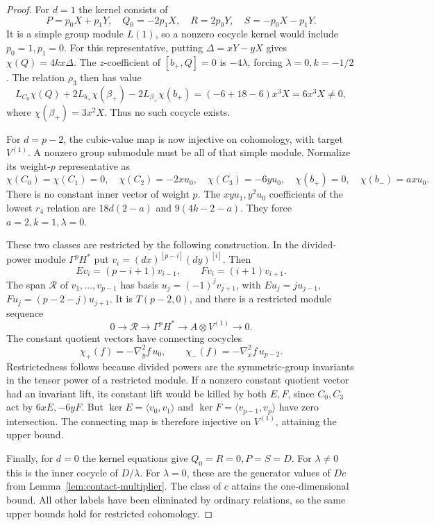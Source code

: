 \documentclass[11pt]{article}
\theoremstyle{plain}
\theoremstyle{definition}
\theoremstyle{remark}
\numberwithin{equation}{section}
\begin{document}
\begin{proof}
For \(d=1\) the kernel consists of
\[
 P=p_0X+p_1Y,\quad Q_0=-2p_1X,\quad
 R=2p_0Y,\quad S=-p_0X-p_1Y .
\]
It is a simple group module \(L(1)\), so a nonzero cocycle
kernel would include \(p_0=1,p_1=0\).
For this representative, putting \(\Delta=xY-yX\) gives
\(\chi(Q)=4kx\Delta\). The \(z\)-coefficient of \([b_+,Q]=0\)
is \(-4\lambda\), forcing \(\lambda=0,k=-1/2\).
The relation \(\rho_3\) then has value
\[
 L_{C_0}\chi(Q)+2L_{b_+}\chi(\beta_+)
                  -2L_{\beta_+}\chi(b_+)
      =(-6+18-6)x^3X=6x^3X\ne0,
\]
where \(\chi(\beta_+)=3x^2X\).
Thus no such cocycle exists.

For \(d=p-2\), the cubic-value map is now injective on cohomology,
with target \(V^{(1)}\).
A nonzero group submodule must be all of that simple module.
Normalize its weight-\(p\) representative as
\[
 \chi(C_0)=\chi(C_1)=0,\quad
 \chi(C_2)=-2xu_0,\quad\chi(C_3)=-6yu_0,\quad
 \chi(b_+)=0,\quad\chi(b_-)=a xu_0 .
\]
There is no constant inner vector of weight \(p\).
The \(xyu_1,y^2u_0\) coefficients of the lowest \(r_4\) relation
are \(18d(2-a)\) and \(9(4k-2-a)\).
They force \(a=2,k=1,\lambda=0\).

These two classes are restricted by the following construction.
In the divided-power module \(\Gamma^pH^*\) put
\(v_i=(dx)^{[p-i]}(dy)^{[i]}\).
Then
\[
 Ev_i=(p-i+1)v_{i-1},\qquad Fv_i=(i+1)v_{i+1}.
\]
The span \(\mathcal R\) of \(v_1,\ldots,v_{p-1}\) has basis
\(u_j=(-1)^jv_{j+1}\), with
\(Eu_j=ju_{j-1}\), \(Fu_j=(p-2-j)u_{j+1}\).
It is \(T(p-2,0)\), and there is a restricted module sequence
\[
 0\longrightarrow\mathcal R\longrightarrow\Gamma^pH^*
       \longrightarrow A\otimes V^{(1)}\longrightarrow0 .
\]
The constant quotient vectors have connecting cocycles
\[
 \chi_+(f)=-\nabla_y^2f\,u_0,\qquad
 \chi_-(f)=-\nabla_x^2f\,u_{p-2}.
\]
Restrictedness follows because divided powers are the symmetric-group
invariants in the tensor power of a restricted module.
If a nonzero constant quotient vector had an invariant lift,
its constant lift would be killed by both \(E,F\), since
\(C_0,C_3\) act by \(6xE,-6yF\).
But
\(\ker E=\langle v_0,v_1\rangle\) and
\(\ker F=\langle v_{p-1},v_p\rangle\) have zero intersection.
The connecting map is therefore injective on \(V^{(1)}\),
attaining the upper bound.

Finally, for \(d=0\) the kernel equations give
\(Q_0=R=0,P=S=D\).
For \(\lambda\ne0\) this is the inner cocycle of \(D/\lambda\).
For \(\lambda=0\), these are the generator values of \(Dc\)
from Lemma~\ref{lem:contact-multiplier}. The class of \(c\) attains the one-dimensional bound.
All other labels have been eliminated by ordinary relations, so the
same upper bounds hold for restricted cohomology.
\end{proof}
\end{document}
